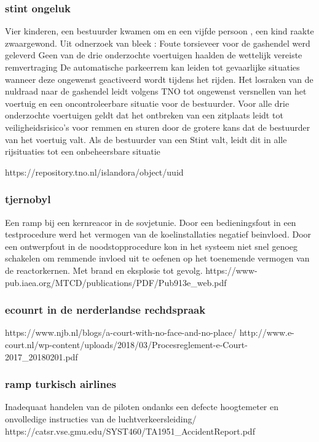\subsubsection{stint ongeluk}
Vier kinderen, een bestuurder kwamen om en een vijfde persoon , een kind raakte zwaargewond. Uit odnerzoek van bleek :
Foute torsieveer voor de gashendel werd geleverd
Geen van de drie onderzochte voertuigen haalden de wettelijk vereiste remvertraging
De automatische parkeerrem kan leiden tot gevaarlijke situaties wanneer deze ongewenst geactiveerd wordt tijdens het rijden. 
Het losraken van de nuldraad naar de gashendel leidt volgens TNO tot ongewenst versnellen van het voertuig en een oncontroleerbare situatie voor de bestuurder.
Voor alle drie onderzochte voertuigen geldt dat het ontbreken van een zitplaats leidt tot veiligheidsrisico’s voor remmen en sturen door de grotere kans dat de bestuurder van het voertuig valt. Als de bestuurder van een Stint valt, leidt dit in alle rijsituaties tot een onbeheersbare situatie


https://repository.tno.nl/islandora/object/uuid%


\subsubsection{tjernobyl}
Een ramp bij een kernreacor in de sovjetunie. Door een bedieningsfout in een testprocedure werd het vermogen van de koelinstallaties negatief beinvloed. Door een ontwerpfout in de noodstopprocedure kon in het systeem niet snel genoeg schakelen om remmende invloed uit te oefenen op het toenemende vermogen van de reactorkernen. Met brand en eksplosie tot gevolg.
https://www-pub.iaea.org/MTCD/publications/PDF/Pub913e_web.pdf 

\subsubsection{ecounrt in de nerderlandse rechdspraak}
https://www.njb.nl/blogs/a-court-with-no-face-and-no-place/ 
http://www.e-court.nl/wp-content/uploads/2018/03/Procesreglement-e-Court-2017_20180201.pdf 


 

\subsubsection{ramp turkisch airlines}
Inadequaat handelen van de piloten ondanks een defecte hoogtemeter en onvolledige instructies van de luchtverkeersleiding/
https://catsr.vse.gmu.edu/SYST460/TA1951_AccidentReport.pdf 

